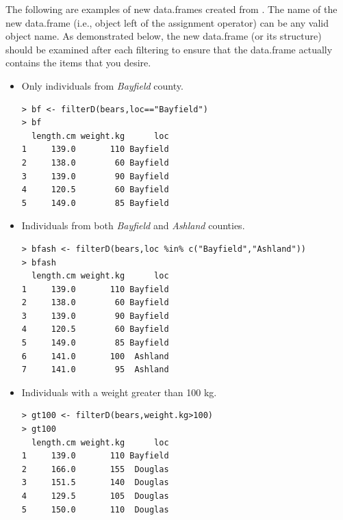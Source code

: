 \documentclass[10pt,openany]{book}\usepackage[]{graphicx}\usepackage[]{color}
\makeatletter
\newenvironment{kframe}{%
 \def\at@end@of@kframe{}%
 \ifinner\ifhmode%
  \def\at@end@of@kframe{\end{minipage}}%
  \begin{minipage}{\columnwidth}%
 \fi\fi%
 \def\FrameCommand##1{\hskip\@totalleftmargin \hskip-\fboxsep
 \colorbox{shadecolor}{##1}\hskip-\fboxsep
     \hskip-\linewidth \hskip-\@totalleftmargin \hskip\columnwidth}%
 \MakeFramed {\advance\hsize-\width
   \@totalleftmargin\z@ \linewidth\hsize
   \@setminipage}}%
 {\par\unskip\endMakeFramed%
 \at@end@of@kframe}
\newenvironment{knitrout}{}{} %
\makeatother
\begin{document}
\vspace{6pt}
The following are examples of new data.frames created from . The name of the new data.frame (i.e., object left of the assignment operator) can be any valid object name. As demonstrated below, the new data.frame (or its structure) should be examined after each filtering to ensure that the data.frame actually contains the items that you desire.

\vspace{-8pt}
\begin{itemize}
  \item Only individuals from \emph{Bayfield} county.
\vspace{-4pt}
\begin{knitrout}
\color{fgcolor}\begin{kframe}
\begin{verbatim}
> bf <- filterD(bears,loc=="Bayfield")
> bf
  length.cm weight.kg      loc
1     139.0       110 Bayfield
2     138.0        60 Bayfield
3     139.0        90 Bayfield
4     120.5        60 Bayfield
5     149.0        85 Bayfield
\end{verbatim}
\end{kframe}
\end{knitrout}

  \item Individuals from both \emph{Bayfield} and \emph{Ashland} counties.
\vspace{-4pt}
\begin{knitrout}
\color{fgcolor}\begin{kframe}
\begin{verbatim}
> bfash <- filterD(bears,loc %in% c("Bayfield","Ashland"))
> bfash
  length.cm weight.kg      loc
1     139.0       110 Bayfield
2     138.0        60 Bayfield
3     139.0        90 Bayfield
4     120.5        60 Bayfield
5     149.0        85 Bayfield
6     141.0       100  Ashland
7     141.0        95  Ashland
\end{verbatim}
\end{kframe}
\end{knitrout}

  \item Individuals with a weight greater than 100 kg.
\vspace{-4pt}
\begin{knitrout}
\color{fgcolor}\begin{kframe}
\begin{verbatim}
> gt100 <- filterD(bears,weight.kg>100)
> gt100
  length.cm weight.kg      loc
1     139.0       110 Bayfield
2     166.0       155  Douglas
3     151.5       140  Douglas
4     129.5       105  Douglas
5     150.0       110  Douglas
\end{verbatim}
\end{kframe}
\end{knitrout}


\end{itemize}
\end{document}
